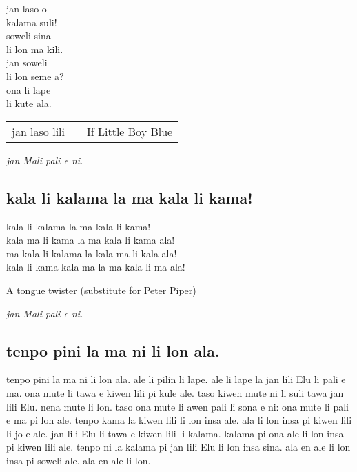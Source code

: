 jan laso o  \\
kalama suli!  \\
soweli sina  \\
li lon ma kili.  \\
jan soweli  \\
li lon seme a?  \\
ona li lape  \\
li kute ala.  \\

\begin{supertabular}{p{5,5cm}|ll}
jan laso lili && If Little Boy Blue \\
\end{supertabular}

\textit{jan Mali pali e ni. \cite{www:astrodonunt:01}}

\subsection{kala li kalama la ma kala li kama!}

kala li kalama la ma kala li kama!           \\
kala ma li kama la ma kala li kama ala!      \\
ma kala li kalama la kala ma li kala ala!    \\
kala li kama kala ma la ma kala li ma ala!

A tongue twister (substitute for Peter Piper)

\textit{jan Mali pali e ni. \cite{www:astrodonunt:01}}


\subsection{tenpo pini la ma ni li lon ala.}

tenpo pini la ma ni li lon ala. 
ale li pilin li lape. 
ale li lape la jan lili Elu li pali e ma. 
ona mute li tawa e kiwen lili pi kule ale. 
taso kiwen mute ni li suli tawa jan lili Elu. 
nena mute li lon.  
taso ona mute li awen pali li sona e ni: ona mute li pali e ma pi lon ale. 
tenpo kama la kiwen lili li lon insa ale. 
ala li lon insa pi kiwen lili li jo e ale. 
jan lili Elu li tawa e kiwen lili li kalama. 
kalama pi ona ale li lon insa pi kiwen lili ale.  
tenpo ni la kalama pi jan lili Elu li lon insa sina. 
ala en ale li lon insa pi soweli ale. 
ala en ale li lon.

